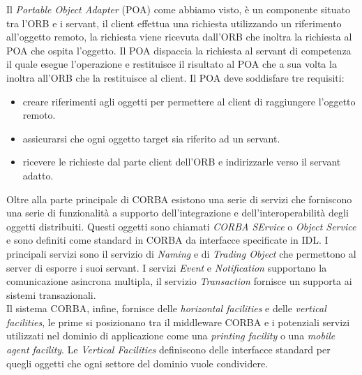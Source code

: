Il \emph{Portable Object Adapter} (POA) come abbiamo visto, è un componente situato tra l'ORB e i servant, il client effettua una richiesta utilizzando un riferimento all'oggetto remoto, la richiesta viene ricevuta dall'ORB che inoltra la richiesta al POA che ospita l'oggetto. Il POA dispaccia la richiesta al servant di competenza il quale esegue l'operazione e restituisce il risultato al POA che a sua volta la inoltra all'ORB che la restituisce al client. Il POA deve soddisfare tre requisiti:
\begin{itemize}
	\item creare riferimenti agli oggetti per permettere al client di raggiungere l'oggetto remoto.
	\item assicurarsi che ogni oggetto target sia riferito ad un servant.
	\item ricevere le richieste dal parte client dell'ORB e indirizzarle verso il servant adatto.
\end{itemize}
Oltre alla parte principale di CORBA esistono una serie di servizi che forniscono una serie di funzionalità a supporto dell'integrazione e dell'interoperabilità degli oggetti distribuiti. Questi oggetti sono chiamati \emph{CORBA SErvice} o \emph{Object Service} e sono definiti come standard in CORBA da interfacce specificate in IDL. I principali servizi sono il servizio di \emph{Naming} e di \emph{Trading Object} che permettono al server di esporre i suoi servant. I servizi \emph{Event} e \emph{Notification} supportano la comunicazione asincrona multipla, il servizio \emph{Transaction} fornisce un supporta ai sistemi transazionali.\\
Il sistema CORBA, infine, fornisce delle \emph{horizontal facilities} e delle \emph{vertical facilities}, le prime si posizionano tra il middleware CORBA e i potenziali servizi utilizzati nel dominio di applicazione come una \emph{printing facility} o una \emph{mobile agent facility}.
Le \emph{Vertical Facilities} definiscono delle interfacce standard per quegli oggetti che ogni settore del dominio vuole condividere.

